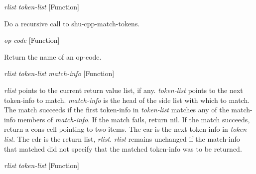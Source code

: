 \vspace{1em}
\noindent
{}
\usebox{\funcname}\emph{rlist} \emph{token-list}
 \hfill [Function]
\hspace*{\wd\funcname}

\begin{doc-string}
Do a recursive call to shu-cpp-match-tokens.
\end{doc-string}

\vspace{1em}
\noindent
{}
\usebox{\funcname}\emph{op-code}
 \hfill [Function]

\begin{doc-string}
Return the name of an op-code.
\end{doc-string}

\vspace{1em}
\noindent
{}
\usebox{\funcname}\emph{rlist} \emph{token-list} \emph{match-info}
 \hfill [Function]

\begin{doc-string}
\emph{rlist} points to the current return value list, if any.  \emph{token-list} points to
the next token-info to match.  \emph{match-info} is the head of the side list with
which to match.  The match succeeds if the first token-info in \emph{token-list}
matches any of the match-info members of \emph{match-info}.  If the match fails, return
nil.  If the match succeeds, return a cons cell pointing to two items.  The car
is the next token-info in \emph{token-list}.  The cdr is the return list, \emph{rlist}.  \emph{rlist}
remains unchanged if the match-info that matched did not specify that the
matched token-info was to be returned.
\end{doc-string}

\vspace{1em}
\noindent
{}
\usebox{\funcname}\emph{rlist} \emph{token-list}
 \hfill [Function]
\hspace*{\wd\funcname}

